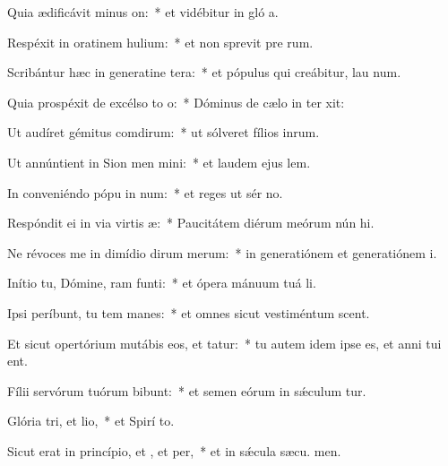 \item Quia ædificávit minus on:~* et vidébitur in gló a.
\item Respéxit in oratinem hulium:~* et non sprevit pre rum.
\item Scribántur hæc in generatine tera:~* et pópulus qui creábitur, lau num.
\item Quia prospéxit de excélso to o:~* Dóminus de cælo in ter xit:
\item Ut audíret gémitus comdirum:~* ut sólveret fílios inrum.
\item Ut annúntient in Sion men mini:~* et laudem ejus  lem.
\item In conveniéndo pópu in num:~* et reges ut sér no.
\item Respóndit ei in via virtis æ:~* Paucitátem diérum meórum nún hi.
\item Ne révoces me in dimídio dirum merum:~* in generatiónem et generatiónem  i.
\item Inítio tu, Dómine, ram funti:~* et ópera mánuum tuá  li.
\item Ipsi períbunt, tu tem manes:~* et omnes sicut vestiméntum scent.
\item Et sicut opertórium mutábis eos, et tatur:~* tu autem idem ipse es, et anni tui  ent.
\item Fílii servórum tuórum bibunt:~* et semen eórum in sǽculum tur.
\item Glória tri, et lio,~* et Spirí to.
\item Sicut erat in princípio, et , et per,~* et in sǽcula sæcu. men.
